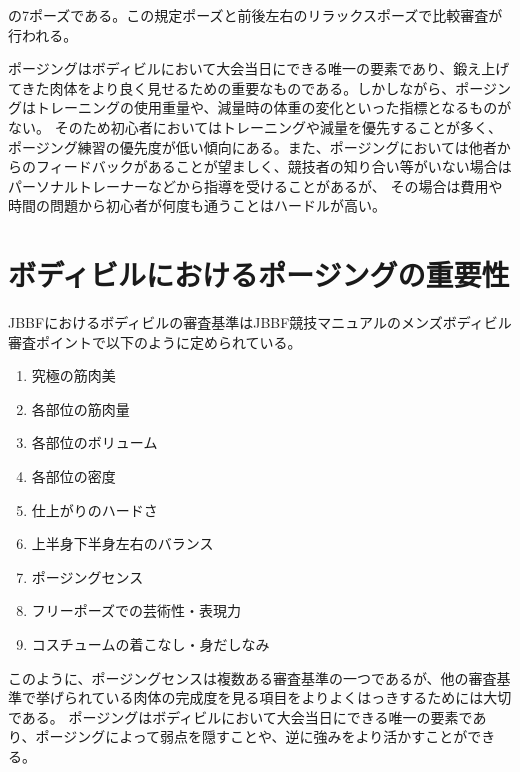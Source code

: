 の7ポーズである。この規定ポーズと前後左右のリラックスポーズで比較審査が行われる。

ポージングはボディビルにおいて大会当日にできる唯一の要素であり、鍛え上げてきた肉体をより良く見せるための重要なものである。しかしながら、ポージングはトレーニングの使用重量や、減量時の体重の変化といった指標となるものがない。
そのため初心者においてはトレーニングや減量を優先することが多く、ポージング練習の優先度が低い傾向にある。また、ポージングにおいては他者からのフィードバックがあることが望ましく、競技者の知り合い等がいない場合はパーソナルトレーナーなどから指導を受けることがあるが、
その場合は費用や時間の問題から初心者が何度も通うことはハードルが高い。

\section{ボディビルにおけるポージングの重要性}
JBBFにおけるボディビルの審査基準はJBBF競技マニュアルのメンズボディビル審査ポイントで以下のように定められている\cite{JBBF2023}。

\begin{enumerate}
  \item 究極の筋肉美
  \item 各部位の筋肉量
  \item 各部位のボリューム
  \item 各部位の密度
  \item 仕上がりのハードさ
  \item 上半身下半身左右のバランス
  \item ポージングセンス
  \item フリーポーズでの芸術性・表現力
  \item コスチュームの着こなし・身だしなみ
\end{enumerate}
このように、ポージングセンスは複数ある審査基準の一つであるが、他の審査基準で挙げられている肉体の完成度を見る項目をよりよくはっきするためには大切である。
ポージングはボディビルにおいて大会当日にできる唯一の要素であり、ポージングによって弱点を隠すことや、逆に強みをより活かすことができる。



